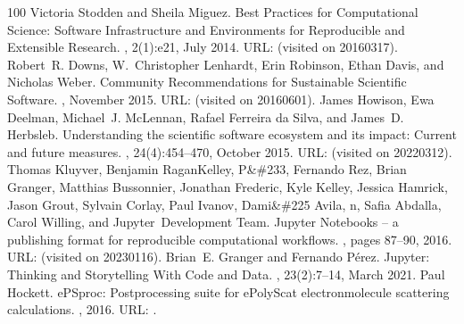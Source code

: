 \documentclass[letterpaper,table,10pt,english]{jupyterBook}
\begin{document}
\begin{sphinxthebibliography}{100}
\sphinxAtStartPar
Victoria Stodden and Sheila Miguez. Best Practices for Computational Science: Software Infrastructure and Environments for Reproducible and Extensible Research. , 2(1):e21, July 2014. URL:  (visited on 2016\sphinxhyphen{}03\sphinxhyphen{}17).
\sphinxAtStartPar
Robert R. Downs, W. Christopher Lenhardt, Erin Robinson, Ethan Davis, and Nicholas Weber. Community Recommendations for Sustainable Scientific Software. , November 2015. URL:  (visited on 2016\sphinxhyphen{}06\sphinxhyphen{}01).
\sphinxAtStartPar
James Howison, Ewa Deelman, Michael J. McLennan, Rafael Ferreira da Silva, and James D. Herbsleb. Understanding the scientific software ecosystem and its impact: Current and future measures. , 24(4):454–470, October 2015. URL:  (visited on 2022\sphinxhyphen{}03\sphinxhyphen{}12).
\sphinxAtStartPar
{}
\sphinxAtStartPar
Thomas Kluyver, Benjamin Ragan\sphinxhyphen{}Kelley, P\&\#233, Fernando Rez, Brian Granger, Matthias Bussonnier, Jonathan Frederic, Kyle Kelley, Jessica Hamrick, Jason Grout, Sylvain Corlay, Paul Ivanov, Dami\&\#225 Avila, n, Safia Abdalla, Carol Willing, and Jupyter Development Team. Jupyter Notebooks – a publishing format for reproducible computational workflows. , pages 87–90, 2016. URL:  (visited on 2023\sphinxhyphen{}01\sphinxhyphen{}16).
\sphinxAtStartPar
Brian E. Granger and Fernando Pérez. Jupyter: Thinking and Storytelling With Code and Data. , 23(2):7–14, March 2021.
\sphinxAtStartPar
Paul Hockett. ePSproc: Post\sphinxhyphen{}processing suite for ePolyScat electron\sphinxhyphen{}molecule scattering calculations. , 2016. URL: .

\end{sphinxthebibliography}
\end{document}

